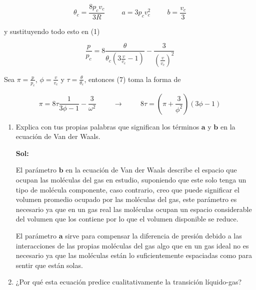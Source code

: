 \documentclass[12pt,a4paper]{article}
\begin{document}
\begin{enumerate}
    \begin{equation}
        \theta_c = \frac{8p_c v_c}{3R} \hspace{1cm} a = 3p_c v_{c}^{2} \hspace{1cm} b = \frac{v_c}{3}
    \end{equation}
    
    y sustituyendo todo esto en (1)
    
    \begin{equation}
         \frac{p}{p_c} = 8 \frac{\theta}{\theta_c(3\frac{v}{v_c}-1)} - \frac{3}{(\frac{v}{v_c})^2}
    \end{equation}
    
    Sea $\pi = \frac{p}{p_c}$, $\phi = \frac{v}{v_c}$ y $\tau = \frac{\theta}{\theta_c}$, entonces (7) toma la forma de
    
    \begin{equation}
        \pi = 8\tau \frac{1}{3\phi - 1} - \frac{3}{\omega^2} \hspace{1cm} \rightarrow \hspace{1cm} 8 \tau = \left(\pi +\frac{3}{\phi^2}\right)(3\phi -1)
    \end{equation}
    
    \begin{enumerate}
        \item Explica con tus propias palabras que significan los términos $\mathbf{a}$ y $\mathbf{b}$ en la ecuación de Van der Waals.
        
        \textbf{Sol:}
        
        El parámetro $\mathbf{b}$ en la ecuación de Van der Waals describe el espacio que ocupan las moléculas del gas en estudio, suponiendo que este solo tenga un tipo de molécula componente, caso contrario, creo que puede significar el volumen promedio ocupado por las moléculas del gas, este parámetro es necesario ya que en un gas real las moléculas ocupan un espacio considerable del volumen que los contiene por lo que el volumen disponible se reduce.
        
        El parámetro $\mathbf{a}$ sirve para compensar la diferencia de presión debido a las interacciones de las propias moléculas del gas algo que en un gas ideal no es necesario ya que las moléculas están lo suficientemente espaciadas como para sentir que están solas.
        
        
        \item ¿Por qué esta ecuación predice cualitativamente la transición líquido-gas?
        

\end{enumerate}
\end{enumerate}
\end{document}
